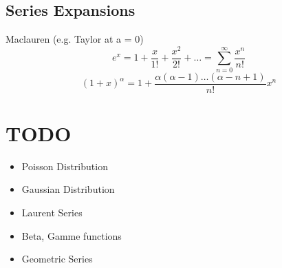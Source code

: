 \documentclass{article}
\begin{document}
\subsection{Series Expansions}
Maclauren (e.g. Taylor at a = 0)
$$
e^{x} = 1 + \frac{x}{1!} + \frac{x^2}{2!} + \dots = \sum_{n=0}^{\infty} \frac{x^n}{n!}
$$
$$
(1+x)^\alpha = 1 + \frac{\alpha(\alpha - 1) \dots (\alpha - n + 1)}{n!}x^{n}
$$

\section{TODO}
\begin{itemize}
	\item Poisson Distribution
	\item Gaussian Distribution
	\item Laurent Series
	\item Beta, Gamme functions
	\item Geometric Series
\end{itemize}
\end{document}
